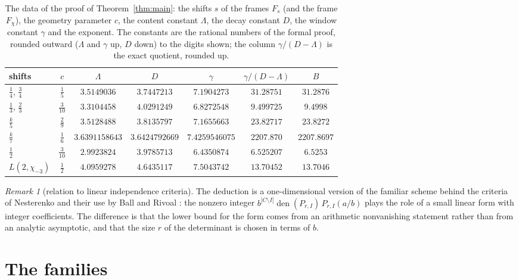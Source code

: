 \documentclass[11pt]{amsart}
\theoremstyle{definition}
\theoremstyle{remark}
\newtheorem{remark}[theorem]{Remark}
\numberwithin{equation}{section}
\newcommand{\den}{\operatorname{den}}
\newcommand{\MuLamU}{31.2876}
\newcommand{\MuThirdsU}{9.4998}
\newcommand{\MuFifthsU}{23.8272}
\newcommand{\MuSeventhsU}{2207.8697}
\newcommand{\MuChi}{13.7046}
\newcommand{\MuHalvesU}{6.5253}
\newcommand{\LamFour}{3.5149036}  \newcommand{\DFour}{3.7447213}  \newcommand{\gFour}{7.1904273}  \newcommand{\ExpFour}{31.28751}
\newcommand{\LamThree}{3.3104458} \newcommand{\DThree}{4.0291249} \newcommand{\gThree}{6.8272548} \newcommand{\ExpThree}{9.499725}
\newcommand{\LamFive}{3.5128488}  \newcommand{\DFive}{3.8135797}  \newcommand{\gFive}{7.1655663}  \newcommand{\ExpFive}{23.82717}
\newcommand{\LamSeven}{3.6391158643} \newcommand{\DSeven}{3.6424792669} \newcommand{\gSeven}{7.4259546075} \newcommand{\ExpSeven}{2207.870}
\newcommand{\LamHalf}{2.9923824}  \newcommand{\DHalf}{3.9785713}  \newcommand{\gHalf}{6.4350874}  \newcommand{\ExpHalf}{6.525207}
\newcommand{\LamChi}{4.0959278}   \newcommand{\DChi}{4.6435117}   \newcommand{\gChi}{7.5043742}  \newcommand{\ExpChi}{13.70452}
\begin{document}
\begin{table}[ht]
\centering
{\setlength{\tabcolsep}{1.2pt}
\begin{tabular}{@{}lcccccc@{}}
\toprule
shifts & $c$ & $\Lambda$ & $D$ & $\gamma$ & $\gamma/(D-\Lambda)$ & $B$\\
\midrule
$\frac14$, $\frac34$ & $\frac15$ & $\LamFour$ & $\DFour$ & $\gFour$ & $\ExpFour$ & $\MuLamU$\\
$\frac13$, $\frac23$ & $\frac3{10}$ & $\LamThree$ & $\DThree$ & $\gThree$ & $\ExpThree$ & $\MuThirdsU$\\
$\frac k5$ & $\frac29$ & $\LamFive$ & $\DFive$ & $\gFive$ & $\ExpFive$ & $\MuFifthsU$\\
$\frac k7$ & $\frac16$ & $\LamSeven$ & $\DSeven$ & $\gSeven$ & $\ExpSeven$ & $\MuSeventhsU$\\
$\frac12$ & $\frac3{10}$ & $\LamHalf$ & $\DHalf$ & $\gHalf$ & $\ExpHalf$ & $\MuHalvesU$\\
$L(2,\chi_{-3})$ & $\frac12$ & $\LamChi$ & $\DChi$ & $\gChi$ & $\ExpChi$ & $\MuChi$\\
\bottomrule
\end{tabular}}
\caption{The data of the proof of Theorem~\ref{thm:main}: the shifts $s$ of the frames $F_s$ (and the frame $F_\chi$), the geometry parameter $c$, the
content constant $\Lambda$, the decay constant $D$, the window constant $\gamma$ and the exponent. The constants are the rational
numbers of the formal proof, rounded outward ($\Lambda$ and $\gamma$ up, $D$ down) to the digits shown; the column $\gamma/(D-\Lambda)$
is the exact quotient, rounded up.}\label{tab:data}
\end{table}

\begin{remark}[relation to linear independence criteria]
The deduction is a one-dimensional version of the familiar scheme behind the criteria of Nesterenko
\cite{Nesterenko85} and their use by Ball and Rivoal \cite{BallRivoal01}: the nonzero integer
$b^{|C\setminus I|}\den(P_{r,I})\,P_{r,I}(a/b)$ plays the role of a small linear form with integer coefficients. The difference is that
the lower bound for the form comes from an arithmetic nonvanishing statement rather than from an analytic asymptotic,
and that the size $r$ of the determinant is chosen in terms of $b$.
\end{remark}

\section{The families}\label{sec:families}
\end{document}
